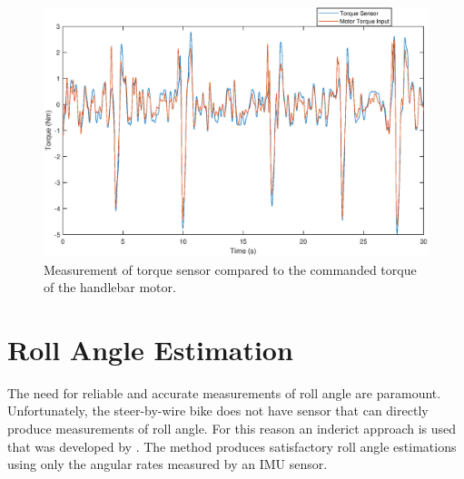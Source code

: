 \begin{figure}[h]
    \centering
    \captionsetup{justification=centering,margin=2cm}

    \includegraphics[scale=0.5]{images/results_torque_sensor.eps}
        \caption[Short title]{Measurement of torque sensor compared to the commanded torque of the handlebar motor.}
    \label{fig:figure7}
\end{figure}

\section{Roll Angle Estimation}
The need for reliable and accurate measurements of roll angle are paramount. Unfortunately, the steer-by-wire bike does not have sensor that can directly produce measurements of roll angle. For this reason an inderict approach is used that was developed by \citet{sanjurjo2018roll}. The method produces satisfactory roll angle estimations using only the angular rates measured by an IMU sensor.

